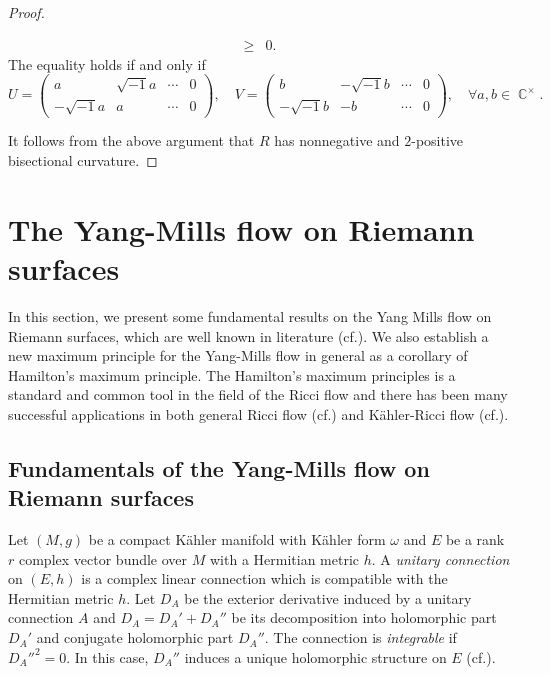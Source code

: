 \documentclass[11pt]{amsart}
\theoremstyle{plain}
\theoremstyle{definition}
\numberwithin{equation}{section}
\DeclareMathOperator{\C}{\mathbb{C}}
\begin{document}
\begin{proof}
\begin{enumerate}
\begin{align*}
            \ge&0.
        \end{align*}
        The equality holds if and only if 
        \begin{equation*}
            U=
            \begin{pmatrix}
                a&\sqrt{-1}a&\cdots&0\\
                -\sqrt{-1}a&a&\cdots&0
            \end{pmatrix},
            \quad
            V=\begin{pmatrix}
                b&-\sqrt{-1}b&\cdots&0\\
                -\sqrt{-1}b&-b&\cdots&0
            \end{pmatrix}, \quad \forall a,b\in\C^\times.
        \end{equation*}
    \end{enumerate}
    It follows from the above argument that $R$ has nonnegative and $2$-positive bisectional curvature.
\end{proof}


\section{The Yang-Mills flow on Riemann surfaces}\label{Sec:YangMills}

In this section, we present some fundamental results on the Yang Mills flow on Riemann surfaces, which are well known in literature (cf.\cite{BL81,AB83,Don83,Rd92,Das92}). We also establish a new maximum principle for the Yang-Mills flow in general as a corollary of Hamilton's maximum principle. The Hamilton's maximum principles is a standard and common tool in the field of the Ricci flow and there has been many successful applications in both general Ricci flow (cf.\cite{Ham86,BW08,BS09}) and K\"{a}hler-Ricci flow (cf.\cite{Che07,Ni07,NZ25}).

\subsection{Fundamentals of the Yang-Mills flow on Riemann surfaces}
Let $(M,g)$ be a compact K\"{a}hler manifold with K\"{a}hler form $\omega$ and $E$ be a rank $r$ complex vector bundle over $M$ with a Hermitian metric $h$. A \emph{unitary connection} on $(E,h)$ is a complex linear connection which is compatible with the Hermitian metric $h$. Let $D_A$ be the exterior derivative induced by a unitary connection $A$ and $D_A=D_A'+D_A''$ be its decomposition into holomorphic part $D_A'$ and conjugate holomorphic part $D_A''$. The connection is \emph{integrable} if $D_A''^2=0$. In this case, $D_A''$ induces a unique holomorphic structure on $E$ (cf.\cite[Proposition 1.4.17]{Kob87}).
\end{document}
